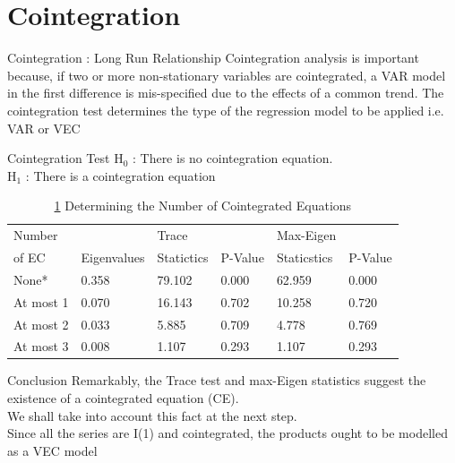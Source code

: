 \documentclass{beamer}
\newcommand{\mathSubTT}[2]{$\text{#1}_{\text{#2}}$}
\begin{document}
	\section{Cointegration}
	\begin{frame}{Cointegration : Long Run Relationship}
		Cointegration analysis is important because, if two or more non-stationary variables are cointegrated, a VAR model in the first difference is mis-specified due to the effects of a common trend. The cointegration test determines the type of the regression model to be applied i.e. VAR or VEC
		
		\begin{block}{ Cointegration Test}
			\mathSubTT{H}{0} : There is no cointegration equation. \\
			\mathSubTT{H}{1} : There is a cointegration equation 
		\end{block}
		
	\end{frame}
	
	\begin{frame}
		
		\begin{table}[]
			\caption{ \ref{table:cointegration} Determining the Number of Cointegrated Equations}
			\label{table:cointegration}
			\begin{tabular}{llllll}
				\toprule
				Number & & Trace &  & Max-Eigen  & \\
				of EC & Eigenvalues & Statictics & P-Value & Staticstics & P-Value \\
				\midrule
				
			   None*     & 0.358 & 79.102 & 0.000 & 62.959 & 0.000 \\ [5pt]	
			   At most 1 & 0.070 & 16.143 & 0.702 & 10.258 & 0.720 \\ [5pt]
			   At most 2 & 0.033 & 5.885  & 0.709 & 4.778  & 0.769 \\ [5pt]
			   At most 3 & 0.008 & 1.107  & 0.293 & 1.107  & 0.293 \\ [5pt]
				\bottomrule
			\end{tabular}
		\end{table}
	
		\begin{exampleblock}{Conclusion}
			Remarkably, the Trace test and max-Eigen statistics suggest the existence of a cointegrated equation (CE). \\ 
			We shall take into account this fact at the next step. \\
			Since all the series are I(1) and cointegrated, the products ought to be modelled as a VEC model 
		\end{exampleblock}
	\end{frame}
\end{document}
